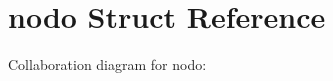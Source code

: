 \hypertarget{structnodo}{}\section{nodo Struct Reference}
\label{structnodo}


Collaboration diagram for nodo\+:
